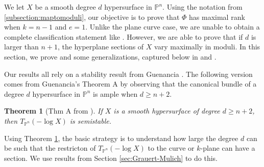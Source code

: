 \documentclass[11pt,reqno]{amsart}
\theoremstyle{plain}
\newtheorem{theorem}{Theorem}[section]
\theoremstyle{definition}
\theoremstyle{remark}
\numberwithin{equation}{section}
\numberwithin{equation}{section}
\newcommand{\PP}{\mathbb{P}}
\begin{document}
We let $X$ be a smooth degree $d$ hypersurface in $\PP^n$. %
Using the notation from \cref{subsection:maptomoduli}, our objective is to prove that $\Phi$ has maximal rank when $k = n-1$ and $e=1$.  Unlike the plane curve case, we are unable to obtain a complete  classification statement like . However, we are able to prove that if $d$ is larger than $n+1$, the hyperplane sections of $X$ vary maximally in moduli. In this section, we prove  and some generalizations, captured below in  and .

Our results all rely on a stability result from Guenancia \cite{guenancia}. The following version comes from Guenancia's Theorem A by observing that the canonical bundle of a degree $d$ hypersurface in $\PP^n$ is ample when $d \geq n+2$.

\begin{theorem}[{Thm A from \cite{guenancia}}]
\label{theorem:Guenancia}
If $X$ is a smooth hypersurface of degree $d \geq n+2$, then $T_{\PP^n}(-\log X)$ is semistable.
\end{theorem}


Using Theorem \ref{theorem:Guenancia}, the basic strategy is to understand how large the degree $d$ can be such that the restricton of $T_{\PP^n}(-\log X)$ to the curve or $k$-plane can have a section. We use results from Section \ref{sec:Grauert-Mulich} to do this.
\end{document}
